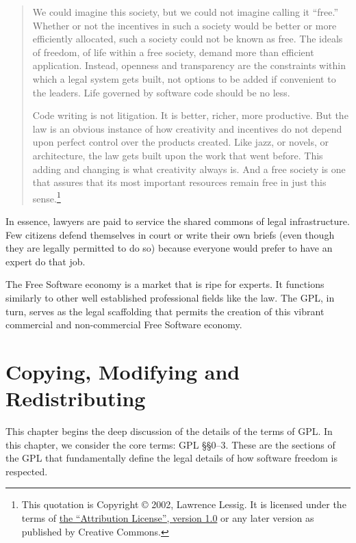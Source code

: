 \documentclass[12pt]{report}
\begin{document}
\begin{quotation}
We could imagine this society, but we could not imagine calling it
``free.''  Whether or not the incentives in such a society would be better
or more efficiently allocated, such a society could not be known as free.
The ideals of freedom, of life within a free society, demand more than
efficient application.  Instead, openness and transparency are the
constraints within which a legal system gets built, not options to be
added if convenient to the leaders.  Life governed by software code should
be no less.

Code writing is not litigation.  It is better, richer, more
productive. But the law is an obvious instance of how creativity and
incentives do not depend upon perfect control over the products created.
Like jazz, or novels, or architecture, the law gets built upon the work
that went before. This adding and changing is what creativity always is.
And a free society is one that assures that its most important resources
remain free in just this sense.\footnote{This quotation is Copyright
  \copyright{} 2002, Lawrence Lessig.  It is licensed under the terms of
  \href{http://creativecommons.org/licenses/by/1.0/}{the ``Attribution
    License'', version 1.0} or any later version as published by Creative
  Commons.}
\end{quotation}

In essence, lawyers are paid to service the shared commons of legal
infrastructure.  Few citizens defend themselves in court or write their
own briefs (even though they are legally permitted to do so) because
everyone would prefer to have an expert do that job.

The Free Software economy is a market that is ripe for experts.  It
functions similarly to other well established professional fields like the
law.  The GPL, in turn, serves as the legal scaffolding that permits the
creation of this vibrant commercial and non-commercial Free Software
economy.

\chapter{Copying, Modifying and Redistributing}

This chapter begins the deep discussion of the details of the terms of
GPL\@.  In this chapter, we consider the core terms: GPL \S\S 0--3.  These
are the sections of the GPL that fundamentally define the legal details of
how software freedom is respected.
\end{document}
